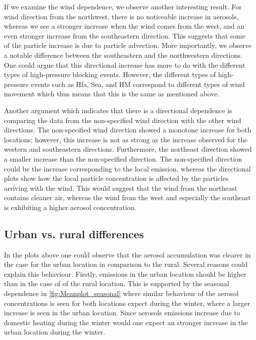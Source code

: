 If we examine the wind dependence, we observe another interesting result. For wind direction from the northwest, there is no noticeable increase in aerosols, whereas we see a stronger increase when the wind comes from the west, and an even stronger increase from the southeastern direction. This suggests that some of the particle increase is due to particle advection. More importantly, we observe a notable difference between the southeastern and the northwestern directions. One could argue that this directional increase has more to do with the different types of high-pressure blocking events. However, the different types of high-pressure events such as Hfa, Sea, and HM correspond to different types of wind movement which thus means that this is the same as mentioned above. 

Another argument which indicates that there is a directional dependence is comparing the data from the non-specified wind direction with the other wind directions. The non-specified wind direction showed a monotone increase for both locations; however, this increase is not as strong as the increase observed for the western and southeastern directions. Furthermore, the northeast direction showed a smaller increase than the non-specified direction. The non-specified direction could be the increase corresponding to the local emission, whereas the directional plots show how the local particle concentration is affected by the particles arriving with the wind. This would suggest that the wind from the northeast contains cleaner air, whereas the wind from the west and especially the southeast is exhibiting a higher aerosol concentration. 

\subsection{Urban vs. rural differences}
In the plots above one could observe that the aerosol accumulation was clearer in the case for the urban location in comparison to the rural. Several reasons could explain this behaviour. Firstly, emissions in the urban location  should be higher than in the case of of the rural location. This is supported by the seasonal dependence in \autoref{fig:Meanplot_seasonal} where similar behaviour of the aerosol concentrations is seen for both locations expect during the winter, where a larger increase is seen in the urban location. Since aerosols emissions increase due to domestic heating during the winter would one expect an stronger increase in the urban location during the winter. 

